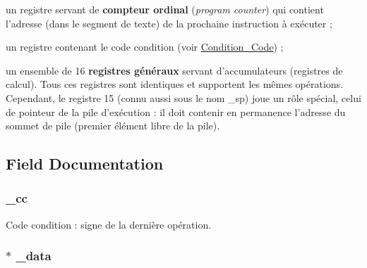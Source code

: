 \begin{DoxyItemize}
\item un registre servant de {\bfseries compteur ordinal} ({\itshape program counter\/}) qui contient l'adresse (dans le segment de texte) de la prochaine instruction à exécuter ;
\end{DoxyItemize}


\begin{DoxyItemize}
\item un registre contenant le code condition (voir \hyperlink{machine_8h_a4bc92b6f72076bb5dd651a143f58a2c3}{\-Condition\-\_\-\-Code}) ;
\end{DoxyItemize}


\begin{DoxyItemize}
\item un ensemble de 16 {\bfseries registres généraux} servant d'accumulateurs (registres de calcul). \-Tous ces registres sont identiques et supportent les mêmes opérations. \-Cependant, le registre 15 (connu aussi sous le nom {\ttfamily \-\_\-sp}) joue un rôle spécial, celui de pointeur de la pile d'exécution \-: il doit contenir en permanence l'adresse du sommet de pile (premier élément libre de la pile). 
\end{DoxyItemize}

\subsection{\-Field \-Documentation}
\hypertarget{struct_machine_a741225dbae765ec0fa5cd14613334b66}{
\subsubsection[{\-\_\-cc}]{ {\bf \-\_\-cc}}}\label{struct_machine_a741225dbae765ec0fa5cd14613334b66}


\-Code condition \-: signe de la dernière opération. 

\hypertarget{struct_machine_a4d0ccf4cdbb4b1b968aaa93dae278c47}{
\subsubsection[{\-\_\-data}]{$\ast$ {\bf \-\_\-data}}}\label{struct_machine_a4d0ccf4cdbb4b1b968aaa93dae278c47}


